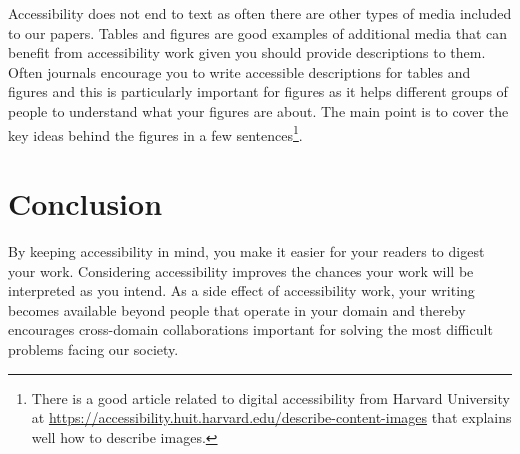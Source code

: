 Accessibility does not end to text as often there are other types of media included to our papers.
Tables and figures are good examples of additional media that can benefit from accessibility work given you should provide descriptions to them.
Often journals encourage you to write accessible descriptions for tables and figures and this is particularly important for figures as it helps different groups of people to understand what your figures are about.
The main point is to cover the key ideas behind the figures in a few sentences\footnote{There is a good article related to digital accessibility from Harvard University at \url{https://accessibility.huit.harvard.edu/describe-content-images} that explains well how to describe images.}.

\section{Conclusion}

By keeping accessibility in mind, you make it easier for your readers to digest your work.
Considering accessibility improves the chances your work will be interpreted as you intend.
As a side effect of accessibility work, your writing becomes available beyond people that operate in your domain and thereby encourages cross-domain collaborations important for solving the most difficult problems facing our society.

